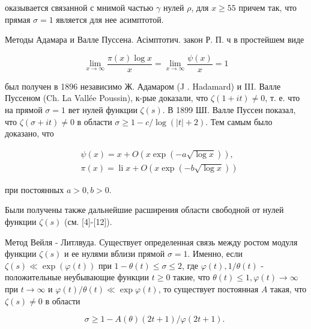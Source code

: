 \documentclass[10pt]{article}
\begin{document}
оказывается связанной с мнимой частью $\gamma$ нулей $\rho$, для $x \geqslant 55$ причем так, что прямая $\sigma=1$ является для нее асимптотой.



Методы Адамара и Валле Пуссена. Асімптотич. закон Р. П. ч в простейшем виде



\[

\lim _{x \rightarrow \infty} \frac{\pi(x) \log x}{x}=\lim _{x \rightarrow \infty} \frac{\psi(x)}{x}=1

\]



был получен в 1896 независимо Ж. Адамаром (J . Hadamard) и III. Валле Пуссеном (Ch. La Vallée Poussin), к-рые доказали, что $\zeta(1+i t) \neq 0$, т. е. что на прямой $\sigma=1$ вет нулей функции $\zeta(s)$. В 1899 ШI. Валле Пуссен показал, что $\zeta(\sigma+i t) \neq 0$ в области $\sigma \geqslant 1-c / \log (|t|+2)$. Тем самым было доказано, что



\[

\begin{aligned}

& \psi(x)=x+O(x \exp (-a \sqrt{\log x})), \\

& \pi(x)=\operatorname{li} x+O(x \exp (-b \sqrt{\log x}))

\end{aligned}

\]



при постоянных $a>0, b>0$.



Были получены также дальнейшие расширения области свободной от нулей функции $\zeta(s)$ (см. [4]-[12]).



Метод Вейля - Литлвуда. Существует определенная связь между ростом модуля функции $\zeta(s)$ и ее нулями вблизи прямой $\sigma=1$. Именно, если $\zeta(s) \ll \exp (\varphi(t))$ при $1-\theta(t) \leqslant \sigma \leqslant 2$, где $\varphi(t), 1 / \theta(t)$ - положительные неубывающие функции $t \geqslant 0$ такие, что $\theta(t) \leqslant 1, \varphi(t) \rightarrow \infty$ при $t \rightarrow \infty$ и $\varphi(t) / \theta(t) \ll \exp \varphi(t)$, то существует постоянная $A$ такая, что $\zeta(s) \neq 0$ в области



\[

\sigma \geqslant 1-A(\theta)(2 t+1) / \varphi(2 t+1) \text {. }

\]
\end{document}
